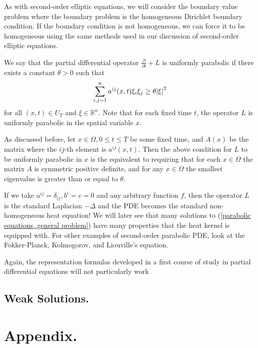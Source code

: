 \documentclass[10pt]{article}
\begin{document}
As with second-order elliptic equations, we will consider the boundary value problem where the boundary problem is the homogeneous Dirichlet boundary condition. If the boundary condition is not homogeneous, we can force it to be homogeneous using the same methods used in our discussion of second-order elliptic equations. 
\begin{definition}
	We say that the partial differential operator $\tfrac{\partial}{\partial t} + L$ is uniformly parabolic if there exists a constant $\theta > 0$ such that 
	\begin{equation*}
		\displaystyle \sum\limits_{i,j=1}^{n}{a^{ij}(x,t)\xi_{i}\xi_j} \geq \theta \abs{\xi}^2
	\end{equation*}
	for all $(x,t) \in U_T$ and $\xi \in \mathbb{R}^n$. Note that for each fixed time $t$, the operator $L$ is uniformly parabolic in the spatial variable $x$. 
\end{definition}
As discussed before, let $x \in \Omega, 0 \leq t \leq T$ be some fixed time, and $A(x)$ be the matrix where the $ij$-th element is $a^{ij}(x,t)$. Then the above condition for $L$ to be uniformly parabolic in $x$ is the equivalent to requiring that for each $x \in \Omega$ the matrix $A$ is symmetric positive definite, and for any $x \in \Omega$ the smallest eigenvalue is greater than or equal to $\theta$. 

If we take $a^{ij} = \delta_{ij}, b^i = c = 0$ and any arbitrary function $f$, then the operator $L$ is the standard Laplacian $-\Delta$ and the PDE becomes the standard non-homogeneous heat equation! We will later see that many solutions to (\ref{parabolic equations, general problem}) have many properties that the heat kernel is equipped with. For other examples of second-order parabolic PDE, look at the Fokker-Planck, Kolmogorov, and Liouville's equation. 

Again, the representation formulas developed in a first course of study in partial differential equations will not particularly work
\subsection{Weak Solutions.}


\section{Appendix.}
\end{document}
